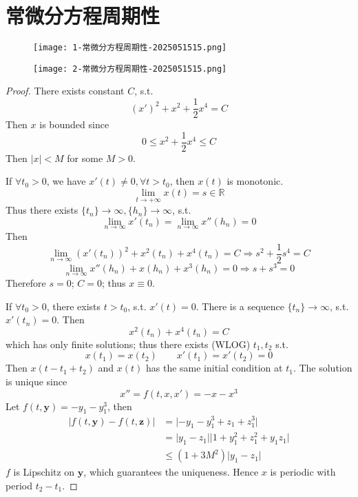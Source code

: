 \section{常微分方程周期性}

\begin{figure}[H]
\centering
\texttt{[image: 1-常微分方程周期性-2025051515.png]}
\label{}
\end{figure}

\begin{exercise}[yau-2020]
\begin{figure}[H]
\centering
\texttt{[image: 2-常微分方程周期性-2025051515.png]}
\label{}
\end{figure}
\end{exercise}
\begin{proof}
There exists constant $C$, s.t.
\[
(x')^2+x^2+\frac{1}{2}x^{4}=C
\]
Then $x$ is bounded since
\[
0\leq x^2+\frac{1}{2}x^{4}\leq C
\]
Then $\lvert x \rvert<M$ for some $M>0$.

If $\forall t_0>0$, we have $x'(t)\neq0,\forall t>t_0$, then $x(t)$ is monotonic.
\[
\lim_{ t \to +\infty } x(t)=s\in \mathbb{R}
\]
Thus there exists $\{ t_n \}\to \infty,\{ h_n \}\to \infty$, s.t.
\[
\lim_{ n \to \infty } x'(t_n)=\lim_{ n \to \infty } x''(h_n)=0
\]
Then
\[
\lim_{ n \to \infty } (x'(t_n))^2+x^2(t_n)+x^{4}(t_n)=C\Rightarrow s^2+\frac{1}{2}s ^{4}=C
\]
\[
\lim_{ n \to \infty } x''(h_n)+x(h_n)+x^{3}(h_n)=0\Rightarrow s+s ^{3}=0
\]
Therefore $s=0$; $C=0$; thus $x\equiv0$.

If $\forall t_0>0$, there exists $t>t_0$, s.t. $x'(t)=0$. There is a sequence $\{ t_n \}\to \infty$, s.t. $x'(t_n)=0$. Then
\[
x^2(t_n)+x^{4}(t_n)=C
\]
which has only finite solutions; thus there exists (WLOG) $t_1,t_2$ s.t.
\[
x(t_1)=x(t_2)\qquad x'(t_1)=x'(t_2)=0
\]
Then $x(t-t_1+t_2)$ and $x(t)$ has the same initial condition at $t_1$. The solution is unique since
\[
x''=f(t,x,x')=-x-x^3
\]
Let $f(t,\boldsymbol{y})=-y_1-y_1^3$, then
\[
\begin{aligned}
\lvert f(t,\boldsymbol{y})-f(t,\boldsymbol{z}) \rvert & =\lvert -y_1-y_1^3+z_1+z_1^3 \rvert  \\
 & =\lvert y_1-z_1 \rvert \lvert 1+y_1^2+z_1^2+y_1z_1 \rvert   \\
 & \leq (1+3M^2)\lvert y_1-z_1 \rvert 
\end{aligned}
\]
$f$ is Lipschitz on $\boldsymbol{y}$, which guarantees the uniqueness. Hence $x$ is periodic with period $t_2-t_1$.
\end{proof}
